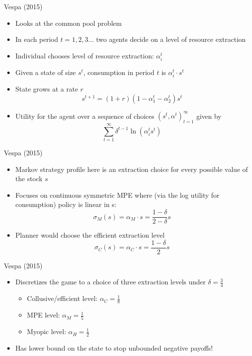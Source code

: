 \documentclass{beamer}
\begin{document}
\begin{frame}{Vespa (2015) }
	\begin{itemize}
		\item Looks at the common pool problem
		\item In each period $t=1,2,3\ldots$ two agents decide on a level of resource extraction \pause
		\item Individual chooses level of resource extraction: $\alpha^t_i$
		\item Given a state of size $s^t$, consumption in period $t$ is $\alpha_i^t\cdot s^t$ \pause
		\item State grows at a rate $r$
				$$s^{t+1}=(1+r)(1-\alpha^t_1-\alpha^t_2)s^t$$\pause
		\item Utility for the agent over a sequence of choices $(s^t,\alpha^t)_{t=1}^\infty $ given by
			$$\sum_{t=1}^\infty \delta^{t-1} \ln \left( \alpha^t_i s^t \right) $$
	\end{itemize}
\end{frame}

\begin{frame}{Vespa (2015) }
	\begin{itemize}
		\item Markov strategy profile here is an extraction choice for every possible value of the stock $s$
		\item Focuses on continuous symmetric MPE where (via the log utility for consumption) policy is linear in s:
		$$ \sigma_M(s)=\alpha_M \cdot s=\frac{1-\delta}{2-\delta}s $$
		\item Planner would choose the efficient extraction level
		$$\sigma_C(s)=\alpha_C \cdot s=\frac{1-\delta}{2}s$$
	\end{itemize}
\end{frame}

\begin{frame}{Vespa (2015) }
	\begin{itemize}
		\item Discretizes the game to a choice of three extraction levels under $\delta=\tfrac{3}{4}$
		\begin{itemize}
			\item Collusive/efficient level: $\alpha_C= \tfrac{1}{8}$
			\item MPE level: $\alpha_M= \tfrac{1}{5}$
			\item Myopic level: $\alpha_H= \tfrac{1}{2}$
		\end{itemize}
		\item Has lower bound on the state to stop unbounded negative payoffs!
		\end{itemize}
\end{frame}
\end{document}
